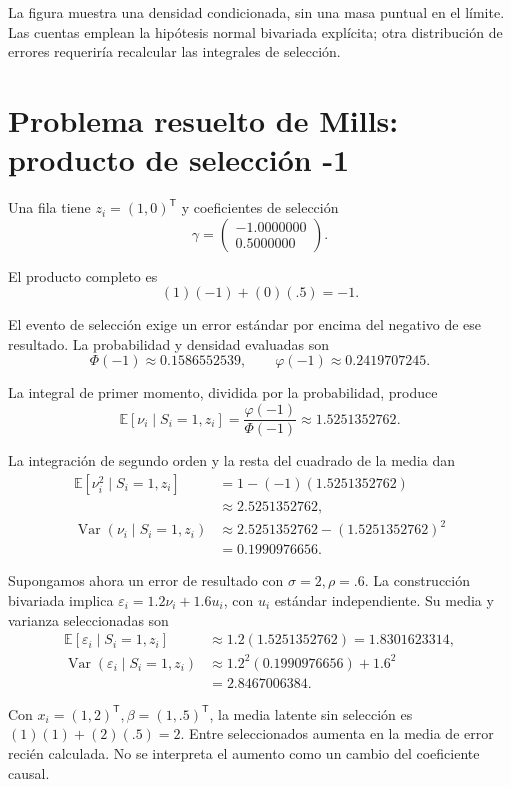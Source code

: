 \documentclass[11pt,a4paper]{article}
\newcommand{\E}{\mathbb E}
\newcommand{\T}{^{\mathsf T}}
\DeclareMathOperator{\Var}{Var}
\begin{document}
La figura muestra una densidad condicionada,
sin una masa puntual en el límite.
Las cuentas emplean la hipótesis
normal bivariada explícita;
otra distribución de errores requeriría
recalcular las integrales de selección.

\clearpage
\section{Problema resuelto de Mills: producto de selección -1}\label{unidad79}
Una fila tiene \(z_i=(1,0)\T\)
y coeficientes de selección
\[
\gamma=\begin{pmatrix}-1.0000000\\0.5000000\end{pmatrix}.
\]

El producto completo es
\[
(1)(-1)+(0)(.5)=-1.
\]

El evento de selección exige un error estándar
por encima del negativo de ese resultado.
La probabilidad y densidad evaluadas son
\[
\Phi(-1)\approx0.1586552539,\qquad\varphi(-1)\approx0.2419707245.
\]

La integral de primer momento, dividida
por la probabilidad, produce
\[
\E[\nu_i\mid S_i=1,z_i]
=\frac{\varphi(-1)}{\Phi(-1)}
\approx1.5251352762.
\]

La integración de segundo orden y
la resta del cuadrado de la media dan
\[
\begin{aligned}
\E[\nu_i^2\mid S_i=1,z_i]&=1-(-1)(1.5251352762)\\
&\approx2.5251352762,\\
\Var(\nu_i\mid S_i=1,z_i)&\approx2.5251352762-(1.5251352762)^2\\
&=0.1990976656.\end{aligned}
\]

Supongamos ahora un error de resultado con
\(\sigma=2,\rho=.6\).
La construcción bivariada implica
\(\varepsilon_i=1.2\nu_i+1.6u_i\),
con \(u_i\) estándar independiente.
Su media y varianza seleccionadas son
\[
\begin{aligned}
\E[\varepsilon_i\mid S_i=1,z_i]&\approx1.2(1.5251352762)
=1.8301623314,\\
\Var(\varepsilon_i\mid S_i=1,z_i)&\approx1.2^2(0.1990976656)+1.6^2\\
&=2.8467006384.\end{aligned}
\]

Con \(x_i=(1,2)\T,\beta=(1,.5)\T\),
la media latente sin selección es
\((1)(1)+(2)(.5)=2\).
Entre seleccionados aumenta en
la media de error recién calculada.
No se interpreta el aumento como
un cambio del coeficiente causal.
\end{document}
